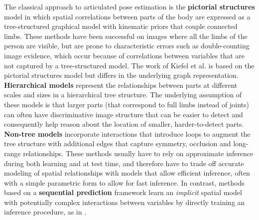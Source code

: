 \documentclass[10pt,twocolumn,letterpaper]{article}
\begin{document}
The classical approach to articulated pose estimation is the \textbf{pictorial structures} model \cite{fh2005pictorial,ramanan2005strike,Andriluka2010,Andriluka2009,pishchulin13iccv,pishchulin2013poselet,yang2011articulated,johnson2010clustered} in which spatial correlations between parts of the body are expressed as a tree-structured graphical model with kinematic priors that couple connected limbs. These methods have been successful on images where all the limbs of the person are visible, but are prone to characteristic errors such as double-counting image evidence, which occur because of correlations between variables that are not captured by a tree-structured model. The work of Kiefel et al. \cite{kiefel2014human} is based on the pictorial structures model but differs in the underlying graph representation. \textbf{Hierarchical models}\cite{tian2012exploring,sun2011articulated} represent the relationships between parts at different scales and sizes in a hierarchical tree structure. The underlying assumption of these models is that larger parts (that correspond to full limbs instead of joints) can often have discriminative image structure that can be easier to detect and consequently help reason about the location of smaller, harder-to-detect parts. 
\textbf{Non-tree models}\cite{wang2008multiple,sigal2006measure,lan2005beyond,karlinsky2012using,Dantone2013} incorporate interactions that introduce loops to augment the tree structure with additional edges that capture symmetry, occlusion and long-range relationships. These methods usually have to rely on approximate inference during both learning and at test time, and therefore have to trade off accurate modeling of spatial relationships with models that allow efficient inference, often with a simple parametric form to allow for fast inference. In contrast, methods based on a \textbf{sequential prediction} framework \cite{Ramakrishna2014posemachines} learn an \emph{implicit} spatial model with potentially complex interactions between variables by directly training an inference procedure, as in \cite{munoz2010,ross2011,tu2010PAMI,Pinheiro14recurrentconvolutional}. 
\end{document}
